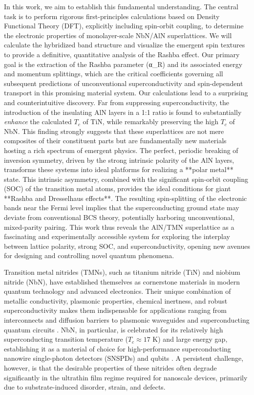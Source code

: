 \documentclass[aps,prl,reprint,superscriptaddress]{revtex4-2}
\begin{document}
In this work, we aim to establish this fundamental understanding. The central task is to perform rigorous first-principles calculations based on Density Functional Theory (DFT), explicitly including spin-orbit coupling, to determine the electronic properties of monolayer-scale NbN/AlN superlattices. We will calculate the hybridized band structure and visualize the emergent spin textures to provide a definitive, quantitative analysis of the Rashba effect. Our primary goal is the extraction of the Rashba parameter (α_R) and its associated energy and momentum splittings, which are the critical coefficients governing all subsequent predictions of unconventional superconductivity and spin-dependent transport in this promising material system.
Our calculations lead to a surprising and counterintuitive discovery. Far from suppressing superconductivity, the introduction of the insulating AlN layers in a 1:1 ratio is found to substantially \textit{enhance} the calculated $T_c$ of TiN, while remarkably preserving the high $T_c$ of NbN. This finding strongly suggests that these superlattices are not mere composites of their constituent parts but are fundamentally new materials hosting a rich spectrum of emergent physics. The perfect, periodic breaking of inversion symmetry, driven by the strong intrinsic polarity of the AlN layers, transforms these systems into ideal platforms for realizing a **polar metal** state. This intrinsic asymmetry, combined with the significant spin-orbit coupling (SOC) of the transition metal atoms, provides the ideal conditions for giant **Rashba and Dresselhaus effects**. The resulting spin-splitting of the electronic bands near the Fermi level implies that the superconducting ground state may deviate from conventional BCS theory, potentially harboring unconventional, mixed-parity pairing. This work thus reveals the AlN/TMN superlattice as a fascinating and experimentally accessible system for exploring the interplay between lattice polarity, strong SOC, and superconductivity, opening new avenues for designing and controlling novel quantum phenomena.

Transition metal nitrides (TMNs), such as titanium nitride (TiN) and niobium nitride (NbN), have established themselves as cornerstone materials in modern quantum technology and advanced electronics. Their unique combination of metallic conductivity, plasmonic properties, chemical inertness, and robust superconductivity makes them indispensable for applications ranging from interconnects and diffusion barriers to plasmonic waveguides and superconducting quantum circuits \cite{shalaev_plasmonics_2007}. NbN, in particular, is celebrated for its relatively high superconducting transition temperature ($T_c \approx 17$ K) and large energy gap, establishing it as a material of choice for high-performance superconducting nanowire single-photon detectors (SNSPDs) and qubits \cite{verma_superconducting_2021}. A persistent challenge, however, is that the desirable properties of these nitrides often degrade significantly in the ultrathin film regime required for nanoscale devices, primarily due to substrate-induced disorder, strain, and defects.
\end{document}
